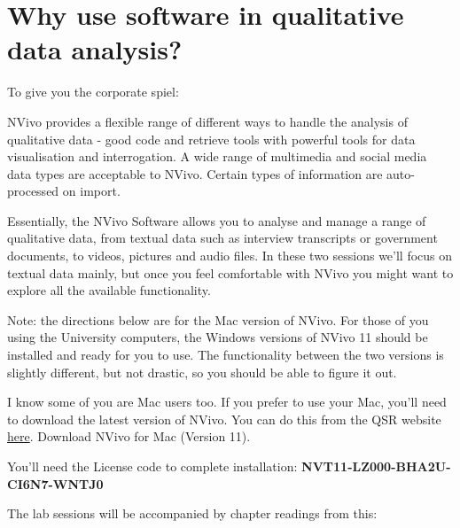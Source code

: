 \documentclass[]{book}
\theoremstyle{definition}
\theoremstyle{definition}
\theoremstyle{definition}
\theoremstyle{remark}
\begin{document}
\hypertarget{why-use-software-in-qualitative-data-analysis}{%
\section{Why use software in qualitative data
analysis?}\label{why-use-software-in-qualitative-data-analysis}}

To give you the corporate spiel:

NVivo provides a flexible range of different ways to handle the analysis
of qualitative data - good code and retrieve tools with powerful tools
for data visualisation and interrogation. A wide range of multimedia and
social media data types are acceptable to NVivo. Certain types of
information are auto-processed on import.

Essentially, the NVivo Software allows you to analyse and manage a range
of qualitative data, from textual data such as interview transcripts or
government documents, to videos, pictures and audio files. In these two
sessions we'll focus on textual data mainly, but once you feel
comfortable with NVivo you might want to explore all the available
functionality.

Note: the directions below are for the Mac version of NVivo. For those
of you using the University computers, the Windows versions of NVivo 11
should be installed and ready for you to use. The functionality between
the two versions is slightly different, but not drastic, so you should
be able to figure it out.

I know some of you are Mac users too. If you prefer to use your Mac,
you'll need to download the latest version of NVivo. You can do this
from the QSR website
\href{http://www.qsrinternational.com/nvivo/support-overview/downloads}{here}.
Download NVivo for Mac (Version 11).

You'll need the License code to complete installation:
\textbf{NVT11-LZ000-BHA2U-CI6N7-WNTJ0}

The lab sessions will be accompanied by chapter readings from this:
\end{document}
